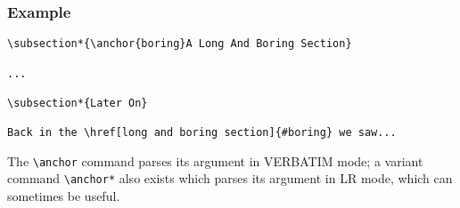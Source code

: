 \subsubsection*{Example}

\begin{verbatim}
\subsection*{\anchor{boring}A Long And Boring Section}

...

\subsection*{Later On}

Back in the \href[long and boring section]{#boring} we saw...
\end{verbatim}

The \verb|\anchor| command parses its argument in VERBATIM mode; a variant
command \verb|\anchor*| also exists which parses its argument in LR mode,
which can sometimes be useful.
